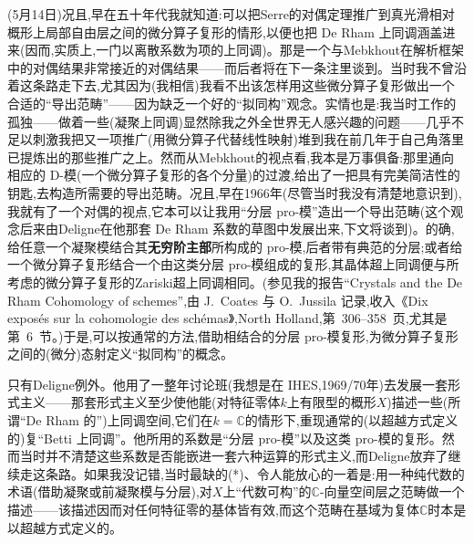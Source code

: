 {(5月14日)况且,早在五十年代我就知道:可以把Serre的对偶定理推广到真光滑相对概形上局部自由层之间的微分算子复形的情形,以便也把 De Rham 上同调涵盖进来(因而,实质上,一门以离散系数为项的上同调)。那是一个与Mebkhout在解析框架中的对偶结果非常接近的对偶结果——而后者将在下一条注里谈到。当时我不曾沿着这条路走下去,尤其因为(我相信)我看不出该怎样用这些微分算子复形做出一个合适的“导出范畴”——因为缺乏一个好的“拟同构”观念。实情也是:我当时工作的孤独——做着一些(凝聚上同调)显然除我之外全世界无人感兴趣的问题——几乎不足以刺激我把又一项推广(用微分算子代替线性映射)堆到我在前几年于自己角落里已提炼出的那些推广之上。然而从Mebkhout的视点看,我本是万事俱备:那里通向相应的 D-模(一个微分算子复形的各个分量)的过渡,给出了一把具有完美简洁性的钥匙,去构造所需要的导出范畴。况且,早在1966年(尽管当时我没有清楚地意识到),我就有了一个对偶的视点,它本可以让我用“分层 pro-模”造出一个导出范畴(这个观念后来由Deligne在他那套 De Rham 系数的草图中发展出来,下文将谈到)。的确,给任意一个凝聚模结合其\textbf{无穷阶主部}所构成的 pro-模,后者带有典范的分层;或者给一个微分算子复形结合一个由这类分层 pro-模组成的复形,其晶体超上同调便与所考虑的微分算子复形的Zariski超上同调相同。(参见我的报告“Crystals and the De Rham Cohomology of schemes”,由 J.~Coates 与 O.~Jussila 记录,收入《Dix exposés sur la cohomologie des schémas》,North Holland,第~306--358~页,尤其是第~6~节。)于是,可以按通常的方法,借助相结合的分层 pro-模复形,为微分算子复形之间的(微分)态射定义“拟同构”的概念。}

\dmark{}只有Deligne例外。他用了一整年讨论班(我想是在 IHES,1969/70年)去发展一套形式主义——那套形式主义至少使他能(对特征零体$k$上有限型的概形$X$)描述一些(所谓“De Rham 的”)上同调空间,它们在$k=\mathbb{C}$的情形下,重现通常的(以超越方式定义的)复“Betti 上同调”。他所用的系数是“分层 pro-模”以及这类 pro-模的复形。然而当时并不清楚这些系数是否能嵌进一套六种运算的形式主义,而Deligne放弃了继续走这条路。如果我没记错,当时最缺的(*)、令人能放心的一着是:用一种纯代数的术语(借助凝聚或前凝聚模与分层),对$X$上“代数可构”的$\mathbb{C}$-向量空间层之范畴做一个描述——该描述因而对任何特征零的基体皆有效,而这个范畴在基域为复体$\mathbb{C}$时本是以超越方式定义的。



